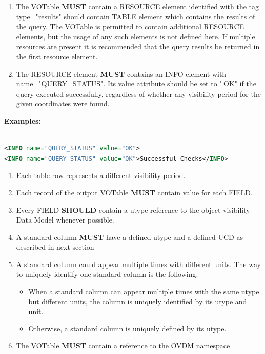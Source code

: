 \documentclass[11pt,a4paper]{ivoa}
\begin{document}
\begin{enumerate}
\item The VOTable \textbf{MUST} contain a RESOURCE element identified
with the tag type="results" should contain TABLE element which contains
the results of the query. The VOTable is permitted to contain additional
RESOURCE elements, but the usage of any such elements is not defined
here. If multiple resources are present it is recommended that the query
results be returned in the first resource element.
\item The RESOURCE element \textbf{MUST} contains an INFO element with
name="QUERY\_STATUS". Its value attribute should be set to "\,OK" if the
query executed successfully, regardless of whether any visibility period
for the given coordinates were found.
\setcounter{numberedCntBI}{\theenumi}
\end{enumerate}

\textbf{Examples: }
\begin{lstlisting}[language=XML]

<INFO name="QUERY_STATUS" value="OK">
<INFO name="QUERY_STATUS" value="OK">Successful Checks</INFO>
\end{lstlisting}

\begin{enumerate}
\setcounter{enumi}{\thenumberedCntBI}
\item Each table row represents a different visibility period.
\item Each record of the output VOTable \textbf{MUST} contain value
for each FIELD.
\item Every FIELD \textbf{SHOULD} contain a utype reference to the
object visibility Data Model whenever possible.
\item A standard column \textbf{MUST} have a defined utype and a
defined UCD as described in next section
\item A standard column could appear multiple times with different
units. The way to uniquely identify one standard column is the
following:
\begin{itemize}
\item When a standard column can appear multiple times with the same
utype but different units, the column is uniquely identified by its
utype and unit.
\item Otherwise, a standard column is uniquely defined by its utype.
\end{itemize}
\item The VOTable \textbf{MUST} contain a reference to the OVDM
namespace
\setcounter{numberedCntBI}{\theenumi}
\end{enumerate}
\end{document}
